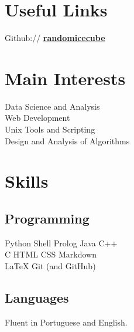 \documentclass[]{deedy-resume-openfont}
\begin{document}
%
%
\lastupdated

%
%

%
%

\begin{minipage}[t]{0.33\textwidth}


\section{Useful Links} 
Github:// \href{https://github.com/randomicecube}{\bf randomicecube} \\


\section{Main Interests}
Data Science and Analysis \\
Web Development\\
Unix Tools and Scripting \\
Design and Analysis of Algorithms


\section{Skills}
\subsection{Programming}
Python \textbullet{} Shell \textbullet{} Prolog \textbullet{} Java \textbullet{} C++ \\
C \textbullet{} HTML \textbullet{} CSS \textbullet{} Markdown \\
\LaTeX \textbullet{} Git (and GitHub)
\sectionsep


\sectionsep

\subsection{Languages}
Fluent in Portuguese and English.
\sectionsep

%
%

\end{minipage} 
\end{document}
